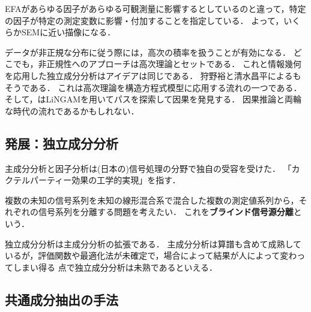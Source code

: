\documentclass[uplatex,dvipdfmx]{jsreport}
\begin{document}
\begin{model}
    EFAがあらゆる因子があらゆる可観測量に影響するとしているのと違って，特定の因子が特定の測定変数に影響・付加することを指定している．
    よって，いくらかSEMに近い描像になる\cite{Grimm-Yarnold}．
\end{model}

\begin{remarks}[高次積率の利用と独立成分分析への展望]
    データが非正規な分布に従う際には，高次の積率を扱うことが有効になる\cite{Mooijaart85-FA-nonGaussian}．
    どこでも，非正規性へのアプローチは高次理論とセットである．
    これと情報幾何を応用した独立成分分析\cite{甘利-村田02-多変量}はアイデアは同じである．
    狩野裕と清水昌平による\cite{Shimizu-Kano03-ICA}もそうである．
    これは高次理論を構造方程式模型に応用する流れ\cite{統計科学のフロンティア5}の一つである．
    そして，\cite{ShimizuEtAl05-Causal-ICA}はLiNGAMを用いてパスを探索して因果を発見する．
    因果推論と両輪な時代の流れであるかもしれない．
\end{remarks}

\subsection{発展：独立成分分析}

\begin{tcolorbox}[colframe=ForestGreen, colback=ForestGreen!10!white,breakable,colbacktitle=ForestGreen!40!white,coltitle=black,fonttitle=\bfseries\sffamily,
title=]
    主成分分析と因子分析は(日本の)信号処理の分野で独自の受容を受けた．
    「カクテルパーティー効果の工学的実現」を指す．
\end{tcolorbox}

\begin{problem}
    複数の未知の信号系列を未知の線形混合系で混合した複数の測定値系列から，それぞれの信号系列を分離する問題を考えたい．
    これを\textbf{ブラインド信号源分離}という．
\end{problem}

\begin{remark}
    独立成分分析は主成分分析の拡張である．
    主成分分析は算譜も含めて成熟しているが，評価関数や最適化法が未確定で，場合によって結果が人によって変わってしまい得る
    点で独立成分分析は未熟であるといえる\cite{村田04-ICA}．
\end{remark}

\subsection{共通成分抽出の手法}
\end{document}
